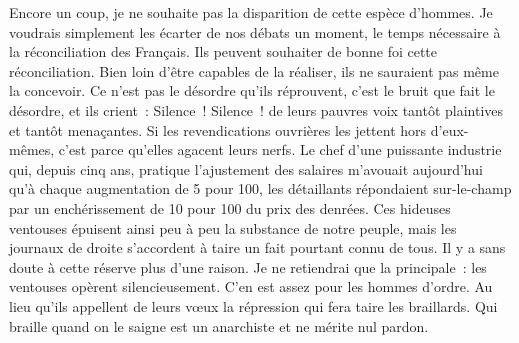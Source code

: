\documentclass[french,twoside]{book} %
\begin{document}
Encore un coup, je ne souhaite pas la disparition de cette espèce d’hommes. Je voudrais simplement les écarter de nos débats un moment, le temps nécessaire à la réconciliation des Français. Ils peuvent souhaiter de bonne foi cette réconciliation. Bien loin d’être capables de la réaliser, ils ne sauraient pas même la concevoir. Ce n’est pas le désordre qu’ils réprouvent, c’est le bruit que fait le désordre, et ils crient : Silence ! Silence ! de leurs pauvres voix tantôt plaintives et tantôt menaçantes. Si les revendications ouvrières les jettent hors d’eux-mêmes, c’est parce qu’elles agacent leurs nerfs. Le chef d’une puissante industrie qui, depuis cinq ans, pratique l’ajustement des salaires m’avouait aujourd’hui qu’à chaque augmentation de 5 pour 100, les détaillants répondaient sur-le-champ par un enchérissement de 10 pour 100 du prix des denrées. Ces hideuses ventouses épuisent ainsi peu à peu la substance de notre peuple, mais les journaux de droite s’accordent à taire un fait pourtant connu de tous. Il y a sans doute à cette réserve plus d’une raison. Je ne retiendrai que la principale : les ventouses opèrent silencieusement. C’en est assez pour les hommes d’ordre. Au lieu qu’ils appellent de leurs vœux la répression qui fera taire les braillards. Qui braille quand on le saigne est un anarchiste et ne mérite nul pardon.\par
\end{document}
